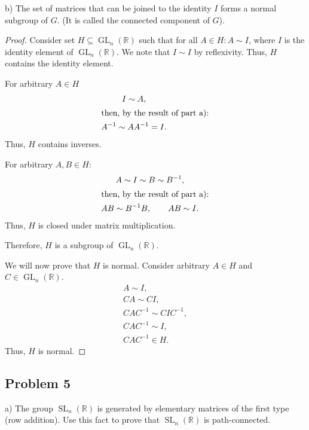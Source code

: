 \documentclass{article}
\theoremstyle{definition}
\newcommand{\R}{\mathbb{R}}
\newcommand{\GL}{\operatorname{GL}}
\newcommand{\SL}{\operatorname{SL}}
\newcommand{\GLnR}{\GL_n(\R)}
\newcommand{\SLnR}{\SL_n(\R)}
\begin{document}
\begin{tcolorbox}
b) The set of matrices that can be joined to the identity $I$ forms a normal subgroup of $G$. (It is called the connected component of $G$).
\end{tcolorbox}

\begin{proof}

Consider set $H \subseteq \GLnR$ such that for all $A \in H : A \sim I$, where $I$ is the identity element of $\GLnR$.
We note that $I \sim I$ by reflexivity.
Thus, $H$ contains the identity element.

For arbitrary $A \in H$
\begin{gather*}
    I \sim A, \\
    \intertext{then, by the result of part a):}
    A^{-1} \sim A A^{-1} = I.
\end{gather*}
Thus, $H$ contains inverses.

For arbitrary $A,B \in H$:
\begin{gather*}
    A \sim I \sim B \sim B^{-1}, \\
    \intertext{then, by the result of part a):}
    AB \sim B^{-1} B, \quad \quad AB \sim I.
\end{gather*}
Thus, $H$ is closed under matrix multiplication.

Therefore, $H$ is a subgroup of $\GLnR$.

We will now prove that $H$ is normal. Consider arbitrary $A \in H$ and $C \in \GLnR$.
\begin{gather*}
    A \sim I, \\
    CA \sim CI, \\
    CAC^{-1} \sim CIC^{-1}, \\
    CAC^{-1} \sim I, \\
    CAC^{-1} \in H.
\end{gather*}
Thus, $H$ is normal.

\end{proof}


\subsection*{Problem 5}

\begin{tcolorbox}
a) The group $\SLnR$ is generated by elementary matrices of the first type (row addition).
Use this fact to prove that $\SLnR$ is path-connected.
\end{tcolorbox}
\end{document}
